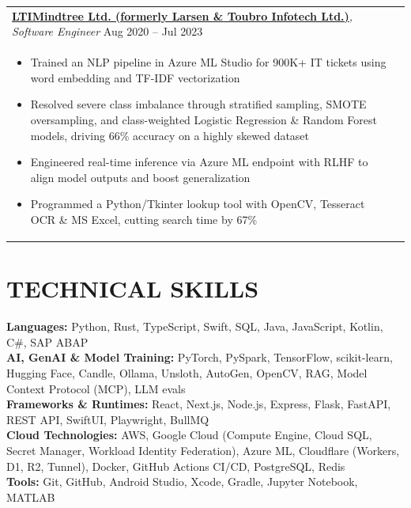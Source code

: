 \documentclass[a4paper,10pt]{extarticle}
\begin{document}
\begin{tabularx}{\linewidth}{ @{}l r@{} }
\textbf{{\href{https://www.ltimindtree.com/}{LTIMindtree Ltd. (formerly Larsen \& Toubro Infotech Ltd.)}}}\textit{, Software Engineer} \hfill \color[HTML]{000000} Aug 2020 – Jul 2023 \\[2pt]
\begin{minipage}[t]{\linewidth}
    \begin{itemize}[nosep,after=\strut, leftmargin=2em, itemsep=2pt]
        \item Trained an NLP pipeline in Azure ML Studio for 900K+ IT tickets using word embedding and TF-IDF vectorization
        \item Resolved severe class imbalance through stratified sampling, SMOTE oversampling, and class-weighted Logistic \newline Regression \& Random Forest models, driving 66\% accuracy on a highly skewed dataset
        \item Engineered real-time inference via Azure ML endpoint with RLHF to align model outputs and boost generalization
        \item Programmed a Python/Tkinter lookup tool with OpenCV, Tesseract OCR \& MS Excel, cutting search time by 67\%
    \end{itemize}
\end{minipage}
\end{tabularx}
\vspace{4pt}

\section{{TECHNICAL SKILLS}}
\vspace{4pt}
\color[HTML]{000000}\textbf{Languages:}\color[HTML]{000000}\hspace*{0ex} Python, Rust, TypeScript, Swift, SQL, Java, JavaScript, Kotlin, C\#, SAP ABAP \\[3pt]
\color[HTML]{000000}\textbf{AI, GenAI \& Model Training:}\color[HTML]{000000}\hspace*{0ex} PyTorch, PySpark, TensorFlow, scikit-learn, Hugging Face, Candle, Ollama, Unsloth, AutoGen, OpenCV, RAG, Model Context Protocol (MCP), LLM evals \\[3pt]
\color[HTML]{000000}\textbf{Frameworks \& Runtimes:}\color[HTML]{000000}\hspace*{0ex} React, Next.js, Node.js, Express, Flask, FastAPI, REST API, SwiftUI, Playwright, BullMQ \\[3pt]
\color[HTML]{000000}\textbf{Cloud Technologies:}\color[HTML]{000000}\hspace*{0ex} AWS, Google Cloud (Compute Engine, Cloud SQL, Secret Manager, Workload Identity Federation), Azure ML, Cloudflare (Workers, D1, R2, Tunnel), Docker, GitHub Actions CI/CD, PostgreSQL, Redis \\[3pt]
\color[HTML]{000000}\textbf{Tools:}\color[HTML]{000000}\hspace*{0ex} Git, GitHub, Android Studio, Xcode, Gradle, Jupyter Notebook, MATLAB \\[-8pt]
\end{document}
